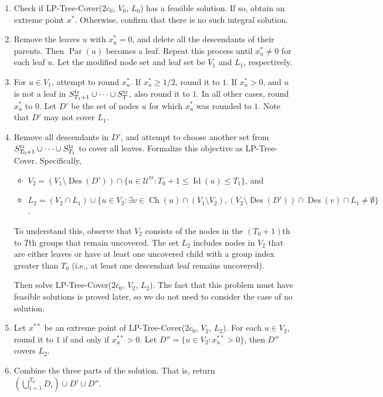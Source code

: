 \documentclass[11pt,a4paper]{article} \usepackage{enumitem}
\newcommand{\calU}{\mathcal{U}}
\newcommand{\trU}{\operatorname{\calU^{tr}}}
\newcommand{\trS}[1]{\ifx\relax#1\relax
    S^{\operatorname{tr}} \else
    S^{\operatorname{tr}}_{#1} \fi
}
\newcommand{\Des}{\operatorname{Des}}
\newcommand{\Ch}{\operatorname{Ch}}
\newcommand{\Lev}{\operatorname{Id}}
\newcommand{\Par}{\operatorname{Par}}
\theoremstyle{definition}
\begin{document}
\begin{enumerate}
\item Check if LP-Tree-Cover($2c_0$, $V_0$, $L_0$) has a feasible solution. If so, obtain an extreme point $x^{*}$. Otherwise, confirm that there is no such integral solution.

\item Remove the leaves $u$ with $x^{*}_u = 0$, and delete all the descendants of their parents. Then $\Par(u)$ becomes a leaf. Repeat this process until $x^{*}_u\neq 0$ for each leaf $u$. Let the modified node set and leaf set be $V_1$ and $L_1$, respectively.

\item For $u \in V_1$, attempt to round $x^{*}_u$. If $x^{*}_u \geq 1/2$, round it to $1$. If $x^{*}_u > 0$, and $u$ is not a leaf in $\trS{T_1+1} \cup \cdots \cup \trS{T}$, also round it to $1$. In all other cases, round $x^{*}_u$ to $0$. Let $D'$ be the set of nodes $u$ for which $x^{*}_u$ was rounded to $1$. Note that $D'$ may not cover $L_1$.

\item Remove all descendants in $D'$, and attempt to choose another set from $\trS{T_0+1} \cup \cdots \cup \trS{T_1}$ to cover all leaves. Formalize this objective as LP-Tree-Cover. Specifically, 
\begin{itemize}
\item $V_2 = (V_1 \setminus \Des(D')) \cap \{u\in \trU: T_0+1\le \Lev(u)\le T_1\}$, and

\item $L_2 = (V_2\cap L_1)\cup \{u \in V_2 :\exists v \in \Ch(u) \cap (V_1 \setminus V_2), (V_2 \setminus \Des(D')) \cap \Des(v) \cap L_1 \neq \emptyset\}$. 
\end{itemize}
To understand this, observe that \( V_2 \) consists of the nodes in the \((T_0+1)\)th to \( T \)th groups that remain uncovered. The set \( L_2 \) includes nodes in \( V_2 \) that are either leaves or have at least one uncovered child with a group index greater than \( T_0 \) (i.e., at least one descendant leaf remains uncovered).

Then solve LP-Tree-Cover($2c_0$, $V_2$, $L_2$). The fact that this problem must have feasible solutions is proved later, so we do not need to consider the case of no solution.

\item Let $x^{**}$ be an extreme point of LP-Tree-Cover($2c_0$, $V_2$, $L_2$). For each $u \in V_2$, round it to $1$ if and only if $x^{**}_u > 0$. Let $D'' = \{u \in V_2 : x^{**}_u > 0\}$, then $D''$ covers $L_2$.

\item Combine the three parts of the solution. That is, return $\left(\bigcup_{i=1}^{T_0} D_i\right) \cup D' \cup D''$.
\end{enumerate}
\end{document}
